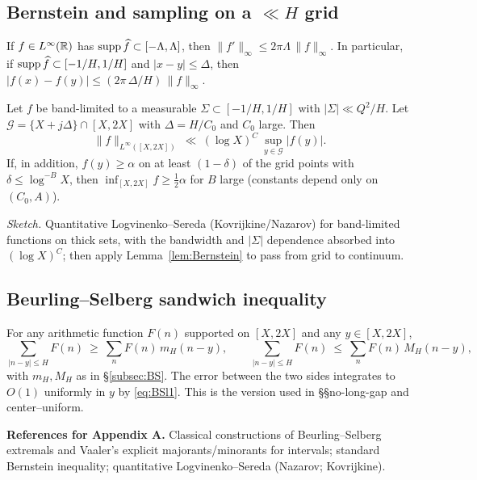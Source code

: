 \subsection*{Bernstein and sampling on a \texorpdfstring{$\ll H$}{<<H} grid}\label{subsec:bernstein-LS}

\begin{lemma}[Bernstein]\label{lem:Bernstein}
If $f\in L^\infty(\mathbb{R})$ has $\operatorname{supp}\widehat f\subset[-\Lambda,\Lambda]$, then $\|f'\|_\infty\le 2\pi \Lambda\,\|f\|_\infty$. In particular,
if $\operatorname{supp}\widehat f\subset[-1/H,1/H]$ and $|x-y|\le \Delta$, then
$|f(x)-f(y)|\le (2\pi\,\Delta/H)\,\|f\|_\infty$.
\end{lemma}

\begin{lemma}\label{lem:LS-grid}
Let $f$ be band-limited to a measurable $\Sigma\subset[-1/H,1/H]$ with $|\Sigma|\ll Q^2/H$. 
Let $\mathcal G=\{X+j\Delta\}\cap[X,2X]$ with $\Delta=H/C_0$ and $C_0$ large.
Then 
\[
  \|f\|_{L^\infty([X,2X])}\ \ll\ (\log X)^C\ \sup_{y\in\mathcal G}|f(y)|.
\]
If, in addition, $f(y)\ge \alpha$ on at least $(1-\delta)$ of the grid points with $\delta\le \log^{-B}X$, then
$\inf_{[X,2X]} f \ge \tfrac12 \alpha$ for $B$ large (constants depend only on $(C_0,A)$).
\end{lemma}

\emph{Sketch.} Quantitative Logvinenko–Sereda (Kovrijkine/Nazarov) for band-limited functions on thick sets, with the bandwidth and $|\Sigma|$ dependence absorbed into $(\log X)^C$; then apply Lemma~\ref{lem:Bernstein} to pass from grid to continuum.

\subsection*{Beurling–Selberg sandwich inequality}\label{subsec:BS-ineq}

For any arithmetic function $F(n)$ supported on $[X,2X]$ and any $y\in[X,2X]$,
\[
  \sum_{|n-y|\le H} F(n)\ \ge\ \sum_{n} F(n)\,m_H(n-y),\qquad
  \sum_{|n-y|\le H} F(n)\ \le\ \sum_{n} F(n)\,M_H(n-y),
\]
with $m_H,M_H$ as in \S\ref{subsec:BS}. The error between the two sides integrates to $O(1)$ uniformly in $y$ by \eqref{eq:BSl1}.
This is the version used in §§no-long-gap and center–uniform.

\bigskip

\noindent\textbf{References for Appendix A.} 
Classical constructions of Beurling–Selberg extremals and Vaaler’s explicit majorants/minorants for intervals; standard Bernstein inequality; quantitative Logvinenko–Sereda (Nazarov; Kovrijkine).
